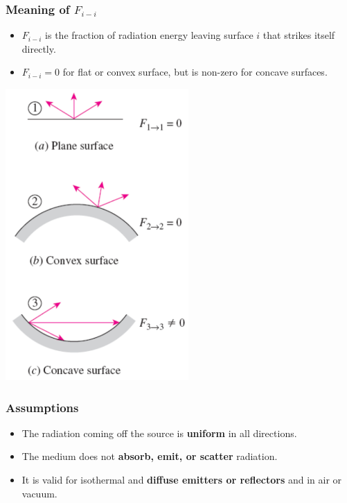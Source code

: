 \documentclass[11pt]{article}
\begin{document}
\subsubsection{Meaning of \(F_{i-i}\)}
\label{sec:orgdfd85b9}
\begin{itemize}
\item \(F_{i-i}\) is the fraction of radiation energy leaving surface \(i\) that strikes itself directly.
\item \(F_{i-i} = 0\) for flat or convex surface, but is non-zero for concave surfaces.
\end{itemize}

\begin{center}
\includegraphics[height=30em]{./images/view-factor-for-surface-striking-itself.png}
\end{center}

\subsubsection{Assumptions}
\label{sec:org1e14729}
\begin{itemize}
\item The radiation coming off the source is \textbf{uniform} in all directions.
\item The medium does not \textbf{absorb, emit, or scatter} radiation.
\item It is valid for isothermal and \textbf{diffuse emitters or reflectors} and in air or vacuum.
\end{itemize}
\end{document}
